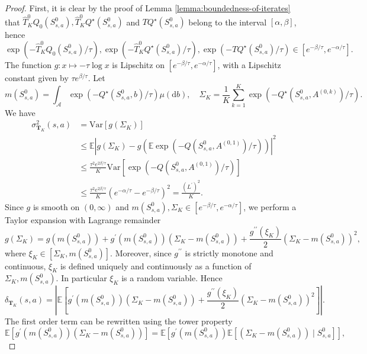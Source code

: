 \documentclass[10pt,a4paper]{amsart}
\def\cA{\mathcal{A}}
\def\d{{\mathrm{d}}}
\begin{document}
\begin{proof}
    First, it is clear by the proof of Lemma \ref{lemma:boundedness-of-iterates} that $\hat{T}_K^0 Q_0(S^0_{s,a}),\hat{T}_K^0 Q^\star(S^0_{s,a})$ and $TQ^\star(S^0_{s,a})$ belong to the interval \(\left[ \alpha, \beta  \right]\),
    hence 
    $$
    \exp \left(-\hat{T}_K^0 Q_0(S^0_{s,a}) / \tau\right),\exp \left(- \hat{T}_K^0 Q^\star(S^0_{s,a})/ \tau \right),\exp \left(-TQ^\star(S^0_{s,a}) / \tau \right) \in \left[e^{-\beta / \tau}, e ^{-\alpha/ \tau}\right].
    $$
    The function $g:x \mapsto -\tau \log x$ is Lipschitz on $\left[e^{-\beta / \tau}, e ^{-\alpha/ \tau}\right]$, with a Lipschitz constant given by
$ \tau e^{\beta/ \tau}$.
Let 
$$
    m (S_{s,a}^0) = \int_{\cA} \exp(- Q^\star(S_{s,a}^0, b) / \tau) \mu(\d b), \quad \Sigma_K = \frac{1}{K}\sum_{k = 1}^K \exp(-Q^\star(S_{s,a}^0, A^{(0,k)}) / \tau).
    $$
We have
    \[
    \begin{aligned}
    \sigma^2_{\mathbf T_K}(s,a) &= \mathrm{Var} \left[ g \left( \Sigma_K \right) \right] \\
    & \leq \mathbb E \left|  g \left( \Sigma_K \right) - g \left(\mathbb E \exp \left(-Q(S^0_{s,a}, A^{(0,1)}) / \tau \right) \right)\right|^2 \\
    & \leq \frac{\tau^2 e^{2\beta / \tau}}{K} \mathrm{Var} \left[ \exp \left(-Q \left(S_{s,a}^0,A^{(0,1)}\right) / \tau \right) \right] \\
    & \leq \frac{\tau^2 e^{2\beta / \tau}}{K} \left( e^{-\alpha / \tau} - e^{-\beta / \tau}  \right)^2 = \frac{(L^\prime)^2}{K}.
    \end{aligned}
    \]
     Since $g$ is smooth on $(0,\infty)$ and $m (S_{s,a}^0),\Sigma_K \in [e^{-\beta / \tau}, e^{-\alpha / \tau}]$, we perform a Taylor expansion with Lagrange remainder
    \[
    g(\Sigma_K) = g(m(S_{s,a}^0)) + g^\prime(m(S^0_{s,a})) (\Sigma_K - m(S^0_{s,a})) + \frac{g^{\prime \prime}(\xi_K)}{2} (\Sigma_K - m(S^0_{s,a}))^2,
    \]
    where $\xi_K \in [\Sigma_K , m(S^0_{s,a})]$. Moreover, since $g^{\prime \prime}$ is strictly monotone and continuous, $\xi_K$ is defined uniquely and continuously as a function of $\Sigma_K , m(S^0_{s,a})$. In particular $\xi_K$ is a random variable. Hence
    \[
        \delta_{\mathbf T_K}(s,a) = \left| \mathbb E \left[ g^\prime(m(S^0_{s,a})) (\Sigma_K - m(S^0_{s,a})) + \frac{g^{\prime \prime}(\xi_K)}{2} (\Sigma_K - m(S^0_{s,a}))^2 \right] \right|.
    \]
    The first order term can be rewritten using the tower property
    \[
    \mathbb E \left[ g^\prime(m(S^0_{s,a})) (\Sigma_K - m(S^0_{s,a})) \right] = \mathbb E \left[g^\prime(m(S_{s,a}^0))\mathbb E \left[ (\Sigma_K - m(S^0_{s,a})) \mid S_{s,a}^0\right]\right],
\]
\end{proof}
\end{document}
